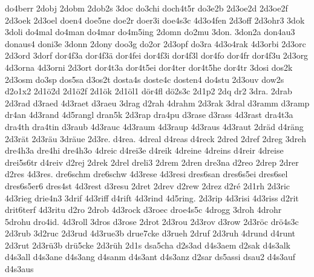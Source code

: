 {    do4berr
    2dobj
    2dobm
    2dob2s
    3doc
    do3chi
    doch4t5r
    do3e2b
    2d3oe2d
    2d3oe2f
    2d3oek
    2d3oel
    doen4
    doe5ne
    doe2r
    doer3i
    doe4s3c
    4d3o4fen
    2d3off
    2d3ohr3
    3dok
    3doli
    do4mal
    do4man
    do4mar
    do4m5ing
    2domn
    do2mu
    3don.
    3don2a
    don4au3
    donaus4
    doni3e
    3donn
    2dony
    doo3g
    do2or
    2d3opf
    do3ra
    4d3o4rak
    4d3orbi
    2d3orc
    2d3ord
    3dorf
    dor4f3a
    dor4f3ä
    dor4fei
    dor4f3i
    dor4f3l
    dor4fo
    dor4fr
    dor4f3u
    2d3org
    4d3orna
    4d3orni
    2d3ort
    dor4t3a
    dor4t5ei
    dor4ter
    dor4t5he
    dor4tr
    3dosi
    dos2k
    2d3osm
    do3sp
    dos5sa
    d3os2t
    dosta4s
    doste4c
    dosten4
    do4stu
    2d3ouv
    dow2s
    d2o1x2
    2d1ö2d
    2d1ö2f
    2d1ök
    2d1öl1
    dör4fl
    dö2s3c
    2d1p2
    2dq
    dr2
    3dra.
    2drab
    2d3rad
    d3raed
    4d3raet
    d3raeu
    3drag
    d2rah
    4drahm
    2d3rak
    3dral
    d3ramm
    d3ramp
    dr4an
    4d3rand
    4d5rangl
    dran5k
    2d3rap
    dra4pu
    d3rase
    d3rass
    4d3rast
    dra4t3a
    dra4th
    dra4tin
    d3raub
    4d3rauc
    4d3raum
    4d3raup
    4d3raus
    4d3raut
    2dräd
    d4räng
    2d3rät
    2d3räu
    3dräue
    2d3re.
    d4rea.
    4dreal
    d4reas
    d4reck
    2dred
    2dref
    2dreg
    3dreh
    dre4h3a
    dre4hi
    dre4h3o
    4dreic
    d4rei3e
    d4reik
    4dreine
    4dreins
    d4reir
    4dreise
    drei5s6tr
    d4reiv
    d2rej
    2drek
    2drel
    dreli3
    2drem
    2dren
    dre3na
    d2reo
    2drep
    2drer
    d2res
    4d3res.
    dre6schm
    dre6schw
    4d3rese
    4d3resi
    dres6san
    dres6s5ei
    dres6sel
    dres6s5er6
    dres4st
    4d3rest
    d3resu
    2dret
    2drev
    d2rew
    2drez
    d2ré
    2d1rh
    2d3ric
    4d3rieg
    drie4n3
    3drif
    4d3riff
    d4rift
    4d3rind
    4d5ring.
    2d3rip
    4d3risi
    4d3riss
    d2rit
    drit6terf
    4d3ritu
    d2ro
    2drob
    4d3rock
    d3roec
    droe4s5c
    4drogg
    3droh
    4drohr
    5drohu
    dro4id.
    4d3roll
    3dros
    d3rose
    2drot
    2d3rou
    2d3rov
    d3row
    2d3röc
    drö4s3c
    2d3rub
    3d2ruc
    2d3rud
    4d3rue3b
    drue7cke
    d3rueh
    2druf
    2d3ruh
    4drund
    d4runt
    2d3rut
    2d3rü3b
    drü5cke
    2d3rüh
    2d1s
    dsa5cha
    d2s3ad
    d4s3aem
    d2sak
    d4s3alk
    d4s3all
    d4s3ane
    d4s3ang
    d4sanm
    d4s3ant
    d4s3anz
    d2sar
    ds5assi
    dsau2
    d4s3auf
    d4s3aus
}
